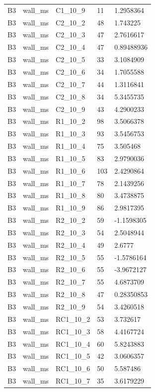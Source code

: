\begin{longtable}{lllll}
B3 & wall\_ms & C1\_10\_9 & 11 & 1.2958364 \\
B3 & wall\_ms & C2\_10\_2 & 48 & 1.743225 \\
B3 & wall\_ms & C2\_10\_3 & 47 & 2.7616617 \\
B3 & wall\_ms & C2\_10\_4 & 47 & 0.89488936 \\
B3 & wall\_ms & C2\_10\_5 & 33 & 3.1084909 \\
B3 & wall\_ms & C2\_10\_6 & 34 & 1.7055588 \\
B3 & wall\_ms & C2\_10\_7 & 44 & 1.3116841 \\
B3 & wall\_ms & C2\_10\_8 & 34 & 5.3455735 \\
B3 & wall\_ms & C2\_10\_9 & 43 & 4.2900233 \\
B3 & wall\_ms & R1\_10\_2 & 98 & 3.5066378 \\
B3 & wall\_ms & R1\_10\_3 & 93 & 3.5456753 \\
B3 & wall\_ms & R1\_10\_4 & 75 & 3.505468 \\
B3 & wall\_ms & R1\_10\_5 & 83 & 2.9790036 \\
B3 & wall\_ms & R1\_10\_6 & 103 & 2.4290864 \\
B3 & wall\_ms & R1\_10\_7 & 78 & 2.1439256 \\
B3 & wall\_ms & R1\_10\_8 & 80 & 3.4738875 \\
B3 & wall\_ms & R1\_10\_9 & 86 & 2.9817395 \\
B3 & wall\_ms & R2\_10\_2 & 59 & -1.1598305 \\
B3 & wall\_ms & R2\_10\_3 & 54 & 2.5048944 \\
B3 & wall\_ms & R2\_10\_4 & 49 & 2.6777 \\
B3 & wall\_ms & R2\_10\_5 & 55 & -1.5786164 \\
B3 & wall\_ms & R2\_10\_6 & 55 & -3.9672127 \\
B3 & wall\_ms & R2\_10\_7 & 55 & 4.6873709 \\
B3 & wall\_ms & R2\_10\_8 & 47 & 0.28350853 \\
B3 & wall\_ms & R2\_10\_9 & 54 & 3.4260518 \\
B3 & wall\_ms & RC1\_10\_2 & 53 & 3.732617 \\
B3 & wall\_ms & RC1\_10\_3 & 58 & 4.4167724 \\
B3 & wall\_ms & RC1\_10\_4 & 60 & 5.8243883 \\
B3 & wall\_ms & RC1\_10\_5 & 42 & 3.0606357 \\
B3 & wall\_ms & RC1\_10\_6 & 50 & 5.587486 \\
B3 & wall\_ms & RC1\_10\_7 & 35 & 3.6179229 \\

\end{longtable}

